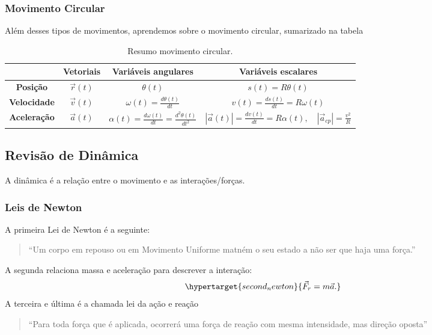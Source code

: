 \documentclass[physics_notes.tex]{subfiles}
\begin{document}
\subsubsection{Movimento Circular}
Além desses tipos de movimentos, aprendemos sobre o movimento circular, sumarizado na tabela
\begin{table}[h!]
	\centering
	\begin{tabular}{|c|c|c|c|}
		\hline
		                    & \textbf{Vetoriais} & \textbf{Variáveis angulares}                                    & \textbf{Variáveis escalares}                                                        \\
		\hline
		\textbf{Posição}    & $\vec{r}(t)$       & $\theta(t)$                                                     & $s(t) = R\theta(t)$                                                                 \\
		\hline
		\textbf{Velocidade} & $\vec{v}(t)$       & $\omega(t) = \frac{d \theta(t)}{dt}$                            & $v(t) = \frac{d s(t)}{dt} = R\omega(t)$                                             \\
		\hline
		\textbf{Aceleração} & $\vec{a}(t)$       & $\alpha(t) = \frac{d\omega(t)}{dt} = \frac{d^2\theta(t)}{dt^2}$ & $|\vec{a}(t)| = \frac{dv(t)}{dt} = R\alpha(t),\quad |\vec{a}_{cp}| = \frac{v^2}{R}$ \\
		\hline
	\end{tabular}
	\caption{Resumo movimento circular.}
	\label{Resumo2MCU}
\end{table}

\subsection{Revisão de Dinâmica}
A dinâmica é a relação entre o movimento e as interações/forças.
\subsubsection{Leis de Newton}
A primeira Lei de Newton é a seguinte:
\begin{quote}
	\hypertarget{first_newton}{``Um corpo em repouso ou em Movimento Uniforme matném o seu estado a não ser que haja uma força.''}
\end{quote}
A segunda relaciona massa e aceleração para descrever a interação:
$$
	\hypertarget{second_newton}{\vec{F}_{r} = m \vec{a}.}
$$
A terceira e última é a chamada lei da ação e reação
\begin{quote}
	\hypertarget{third_newton}{``Para toda força que é aplicada, ocorrerá uma força de reação com mesma intensidade, mas direção oposta''}
\end{quote}
\end{document}
